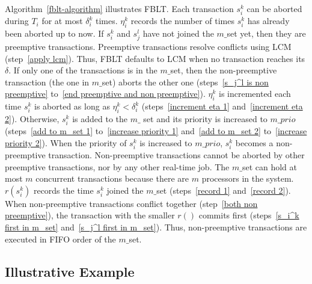 \documentclass[conference]{IEEEtran}
\begin{document}
Algorithm~\ref{fblt-algorithm} illustrates FBLT. Each transaction $s_{i}^{k}$ can be aborted during $T_i$ for at most $\delta_{i}^{k}$ times. $\eta_{i}^{k}$ records  the number of times $s_{i}^{k}$ has already been aborted up to now. If $s_i^k$ and $s_j^l$ have not joined the $m\_$set yet, then they are preemptive transactions. Preemptive transactions resolve conflicts using LCM~\cite{lcmdac2012} (step~\ref{apply lcm}). Thus, FBLT defaults to LCM when no transaction reaches its $\delta$. If only one of the transactions is in the $m\_$set, then the non-preemptive transaction (the one in $m\_$set) aborts the other one (steps~\ref{s_j^l is non preemptive} to~\ref{end preemptive and non preemptive}). $\eta_i^k$ is incremented each time $s_i^k$ is aborted as long as $\eta_i^k < \delta_i^k$ (steps~\ref{increment eta 1} and~\ref{increment eta 2}). Otherwise, $s_i^k$ is added to the $m\_$ set and its priority is increased to $m\_prio$ (steps~\ref{add to m_set 1} to~\ref{increase priority 1} and~\ref{add to m_set 2} to~\ref{increase priority 2}). When the priority of $s_i^k$ is increased to $m\_prio$, $s_i^k$ becomes a non-preemptive transaction. Non-preemptive transactions cannot be aborted by other preemptive transactions, nor by any other real-time job. The $m\_$set can hold at most $m$ concurrent transactions because there are $m$ processors in the system. $r(s_i^k)$ records the time $s_i^k$ joined the $m\_$set (steps~\ref{record 1} and~\ref{record 2}). When non-preemptive transactions conflict together (step~\ref{both non preemptive}), the transaction with the smaller $r()$ commits first (steps~\ref{s_i^k first in m_set} and~\ref{s_j^l first in m_set}). Thus, non-preemptive transactions are executed in FIFO order of the $m\_$set.


\subsection{Illustrative Example}
\end{document}
